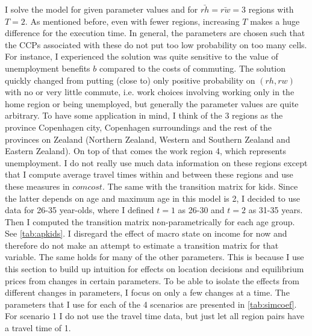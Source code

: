 I solve the model for given parameter values and for $\bar{rh}=\bar{rw}=3$ regions with $T=2$. As mentioned before, even with fewer regions, increasing $T$ makes a huge difference for the execution time. In general, the parameters are chosen such that the CCPs associated with these do not put too low probability on too many cells. For instance, I experienced the solution was quite sensitive to the value of unemployment benefits $b$ compared to the costs of commuting. The solution quickly changed from putting (close to) only positive probability on $(rh,rw)$ with no or very little commute, i.e. work choices involving working only in the home region or being unemployed, but generally the parameter values are quite arbitrary. To have some application in mind, I think of the 3 regions as the province Copenhagen city, Copenhagen surroundings and the rest of the provinces on Zealand (Northern Zealand, Western and Southern Zealand and Eastern Zealand). On top of that comes the work region 4, which represents unemployment. I do not really use much data information on these regions except that I compute average travel times within and between these regions and use these measures in $comcost$. The same with the transition matrix for kids. Since the latter depends on age and maximum age in this model is 2, I decided to use data for 26-35 year-olds, where I defined $t=1$ as 26-30 and $t=2$ as 31-35 years. Then I computed the transition matrix non-parametrically for each age group. See \autoref{tab:apkids}. I disregard the effect of macro state on income for now and therefore do not make an attempt to estimate a transition matrix for that variable. The same holds for many of the other parameters. This is because I use this section to build up intuition for effects on location decisions and equilibrium prices from changes in certain parameters. To be able to isolate the effects from different changes in parameters, I focus on only a few changes at a time. The parameters that I use for each of the 4 scenarios are presented in \autoref{tab:simcoef}. For scenario 1 I do not use the travel time data, but just let all region pairs have a travel time of 1. 

